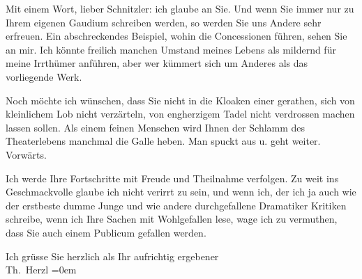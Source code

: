 \pstart
           Mit einem Wort, lieber Schnitzler: ich glaube an Sie. Und wenn Sie immer nur zu Ihrem
               eigenen Gaudium schreiben werden, so werden Sie uns Andere sehr erfreuen. Ein
               abschreckendes Beispiel, wohin die Concessionen führen, sehen Sie an mir. Ich könnte
               freilich manchen Umstand meines Lebens als mildernd für meine Irrthümer anführen,
               aber wer kümmert sich um Anderes als das vorliegende Werk.\pend
           
\pstart
           Noch möchte ich wünschen, dass Sie nicht in die Kloaken einer \label{K_L03823-12v}\label{K_L03823-12}{ }gerathen,
               sich von kleinlichem {\pb}Lob nicht
               verzärteln, von engherzigem Tadel nicht verdrossen machen lassen sollen. Als einem
               feinen Menschen wird Ihnen der Schlamm des Theaterlebens manchmal die Galle heben.
               Man spuckt aus u. geht weiter. Vorwärts.\pend
           
\pstart
           Ich werde Ihre Fortschritte mit Freude und Theilnahme verfolgen. Zu weit ins
               Geschmackvolle glaube ich nicht verirrt zu sein, und wenn ich, der ich ja auch wie
               der erstbeste dumme Junge und wie andere durchgefallene Dramatiker Kritiken schreibe,
               wenn ich Ihre Sachen mit Wohlgefallen lese, wage ich zu vermuthen, dass Sie auch
               einem Publicum gefallen werden.\pend
           
\pstart
           Ich grüsse Sie herzlich als Ihr aufrichtig ergebener{\\[\baselineskip]}\spacefill\mbox{Th. Herzl}\pend
           \leftskip=0em{}\endnumbering{}  \newcommand{\dateiname}{L03823}\newcommand{\titel}{Theodor Herzl an Arthur Schnitzler, 29. 7. 1892}\newcommand{\editorInnen}{Selma Jahnke und Martin Anton Müller}
